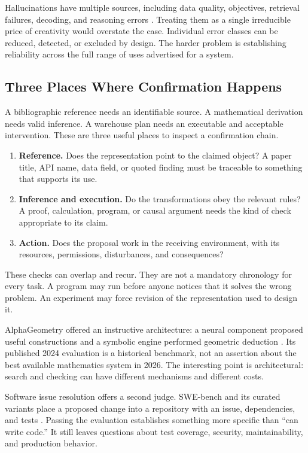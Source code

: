 \documentclass[11pt,openany]{book}
\begin{document}
Hallucinations have multiple sources, including data quality, objectives, retrieval failures, decoding, and reasoning errors \cite{huang2023hallucination}. Treating them as a single irreducible price of creativity would overstate the case. Individual error classes can be reduced, detected, or excluded by design. The harder problem is establishing reliability across the full range of uses advertised for a system.

\subsection{Three Places Where Confirmation Happens}

A bibliographic reference needs an identifiable source. A mathematical derivation needs valid inference. A warehouse plan needs an executable and acceptable intervention. These are three useful places to inspect a confirmation chain.

\begin{enumerate}
 \item \textbf{Reference.} Does the representation point to the claimed object? A paper title, API name, data field, or quoted finding must be traceable to something that supports its use.
 \item \textbf{Inference and execution.} Do the transformations obey the relevant rules? A proof, calculation, program, or causal argument needs the kind of check appropriate to its claim.
 \item \textbf{Action.} Does the proposal work in the receiving environment, with its resources, permissions, disturbances, and consequences?
\end{enumerate}

These checks can overlap and recur. They are not a mandatory chronology for every task. A program may run before anyone notices that it solves the wrong problem. An experiment may force revision of the representation used to design it.

AlphaGeometry offered an instructive architecture: a neural component proposed useful constructions and a symbolic engine performed geometric deduction \cite{trinh2024alphageometry}. Its published 2024 evaluation is a historical benchmark, not an assertion about the best available mathematics system in 2026. The interesting point is architectural: search and checking can have different mechanisms and different costs.

Software issue resolution offers a second judge. SWE-bench and its curated variants place a proposed change into a repository with an issue, dependencies, and tests \cite{swebench2024}. Passing the evaluation establishes something more specific than “can write code.” It still leaves questions about test coverage, security, maintainability, and production behavior.
\end{document}

